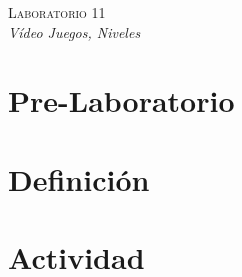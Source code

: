 \begin{center}
\textsc{\Large Laboratorio 11}~\\
\emph{\large Vídeo Juegos, Niveles}
\end{center}

\section{Pre-Laboratorio}

\section{Definición}


\section{Actividad}
